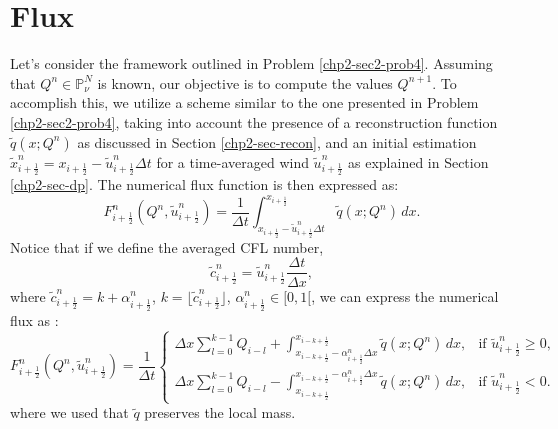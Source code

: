 \section{Flux}
\label{chp2-sec-flux}
Let's consider the framework outlined in Problem \ref{chp2-sec2-prob4}.
Assuming that $Q^{n} \in \mathbb{P}^{N}_{\nu}$ is known, our objective is to compute the values $Q^{n+1}$.
To accomplish this, we utilize a scheme similar to the one presented in Problem \ref{chp2-sec2-prob4},
taking into account the presence of a reconstruction function $\tilde{q}(x;Q^n)$ as discussed in Section
\ref{chp2-sec-recon}, and an initial estimation
$\tilde{x}_{i+\frac{1}{2}}^n = {x}_{i+\frac{1}{2}} -\tilde{u}_{i+\frac{1}{2}}^n \Delta t$
for a time-averaged wind $\tilde{u}_{i+\frac{1}{2}}^n$ as explained in Section \ref{chp2-sec-dp}.
The numerical flux function is then expressed as:
\begin{equation}
	\label{chp-sec-flux:numerical-flux1}
	F^{n}_{i+\frac{1}{2}}(Q^n,\tilde{u}_{i+\frac{1}{2}}^n)  = \frac{1}{\Delta t}
	\int_{x_{i+\frac{1}{2}}-\tilde{u}^n_{i+\frac{1}{2}}\Delta t}^{x_{i+\frac{1}{2}}}
	\tilde{q}(x;Q^n) \,dx.
\end{equation}
Notice that if we define the averaged CFL number,
\begin{equation*}
	\label{chp-sec-flux:cedges}
	\tilde{c}_{i+\frac{1}{2}}^n = \tilde{u}_{i+\frac{1}{2}}^n\frac{\Delta t}{\Delta x},
\end{equation*}
where $\tilde{c}_{i+\frac{1}{2}}^n = k + \alpha_{i+\frac{1}{2}}^n$, $k = \lfloor \tilde{c}_{i+\frac{1}{2}}^n \rfloor$,
$\alpha_{i+\frac{1}{2}}^n \in [0,1[$,
we can express the numerical flux as \citep{lin:1996, chen:2017}:
\begin{equation}
	\label{chp-sec-flux:numerical-flux}
	F_{i+\frac{1}{2}}^n(Q^n,\tilde{u}_{i+\frac{1}{2}}^n) =  \frac{1}{\Delta t}
	\begin{cases}
	\Delta x\sum_{l=0}^{k-1} Q_{i-l} +  
    \int_{x_{i-k+\frac{1}{2}}-{\alpha}^n_{i+\frac{1}{2}}\Delta x}^{x_{i-k+\frac{1}{2}}}
    \tilde{q}(x;Q^n) \,dx, & \text{if } \tilde{u}_{i+\frac{1}{2}}^n \geq 0,\\
	\Delta x\sum_{l=0}^{k-1} Q_{i-l} -  
    \int^{x_{i-k+\frac{1}{2}}-{\alpha}^n_{i+\frac{1}{2}}\Delta x}_{x_{i-k+\frac{1}{2}}}
    \tilde{q}(x;Q^n) \,dx, & \text{if } \tilde{u}_{i+\frac{1}{2}}^n < 0.
	\end{cases}
\end{equation}
where we used that $\tilde{q}$ preserves the local mass.

